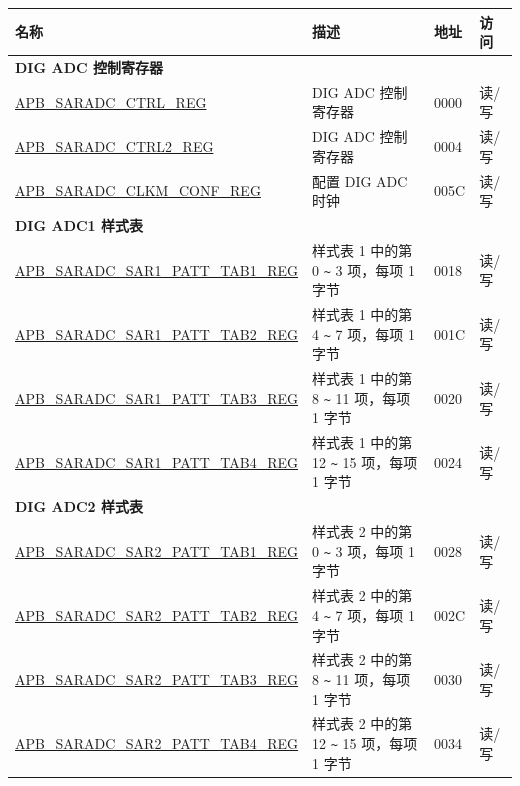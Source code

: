 \begin{longtable}{ | p{6cm} | p{7.2cm} | p{1.3cm} | p{1cm} | }
\hline\rowcolor{lightgray}
名称 & 描述 & 地址 & 访问 \\ \hline
\endhead
\multicolumn{4}{|l|}{\textbf{DIG ADC 控制寄存器}} \\ \hline
\hyperref[regdesc:APBSARADCCTRLREG]{APB\_SARADC\_CTRL\_REG} & DIG ADC 控制寄存器 & \hexprefix{}0000 & 读/写 \\ \hline
\hyperref[regdesc:APBSARADCCTRL2REG]{APB\_SARADC\_CTRL2\_REG} & DIG ADC 控制寄存器 & \hexprefix{}0004 & 读/写 \\ \hline
\hyperref[regdesc:APBSARADCAPBADCCLKMCONFREG]{APB\_SARADC\_CLKM\_CONF\_REG} & 配置 DIG ADC 时钟 & \hexprefix{}005C & 读/写 \\ \hline
\multicolumn{4}{|l|}{\textbf{DIG ADC1 样式表}} \\ \hline
\hyperref[regdesc:APBSARADCSAR1PATTTAB1REG]{APB\_SARADC\_SAR1\_PATT\_TAB1\_REG} & 样式表 1 中的第 0 \verb+~+ 3 项，每项 1 字节 & \hexprefix{}0018 & 读/写 \\ \hline
\hyperref[regdesc:APBSARADCSAR1PATTTAB2REG]{APB\_SARADC\_SAR1\_PATT\_TAB2\_REG} & 样式表 1 中的第 4 \verb+~+ 7 项，每项 1 字节 & \hexprefix{}001C & 读/写 \\ \hline
\hyperref[regdesc:APBSARADCSAR1PATTTAB3REG]{APB\_SARADC\_SAR1\_PATT\_TAB3\_REG} & 样式表 1 中的第 8 \verb+~+ 11 项，每项 1 字节 & \hexprefix{}0020 & 读/写 \\ \hline
\hyperref[regdesc:APBSARADCSAR1PATTTAB4REG]{APB\_SARADC\_SAR1\_PATT\_TAB4\_REG} & 样式表 1 中的第 12 \verb+~+ 15 项，每项 1 字节 & \hexprefix{}0024 & 读/写 \\ \hline
\multicolumn{4}{|l|}{\textbf{DIG ADC2 样式表}} \\ \hline
\hyperref[regdesc:APBSARADCSAR2PATTTAB1REG]{APB\_SARADC\_SAR2\_PATT\_TAB1\_REG} & 样式表 2 中的第 0 \verb+~+ 3 项，每项 1 字节 & \hexprefix{}0028 & 读/写 \\ \hline
\hyperref[regdesc:APBSARADCSAR2PATTTAB2REG]{APB\_SARADC\_SAR2\_PATT\_TAB2\_REG} & 样式表 2 中的第 4 \verb+~+ 7 项，每项 1 字节 & \hexprefix{}002C & 读/写 \\ \hline
\hyperref[regdesc:APBSARADCSAR2PATTTAB3REG]{APB\_SARADC\_SAR2\_PATT\_TAB3\_REG} & 样式表 2 中的第 8 \verb+~+ 11 项，每项 1 字节 & \hexprefix{}0030 & 读/写 \\ \hline
\hyperref[regdesc:APBSARADCSAR2PATTTAB4REG]{APB\_SARADC\_SAR2\_PATT\_TAB4\_REG} & 样式表 2 中的第 12 \verb+~+ 15 项，每项 1 字节 & \hexprefix{}0034 & 读/写 \\ \hline

\end{longtable}

